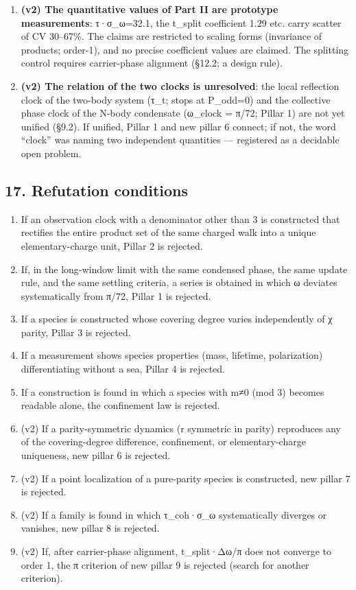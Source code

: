 \documentclass[
]{article}
\providecommand{\tightlist}{%
  \setlength{\itemsep}{0pt}\setlength{\parskip}{0pt}}
\begin{document}
\begin{enumerate}
  in-class series.
\item
  \textbf{(v2) The quantitative values of Part II are prototype
  measurements}: τ·σ\_ω=32.1, the t\_split coefficient 1.29 etc. carry
  scatter of CV 30--67\%. The claims are restricted to scaling forms
  (invariance of products; order-1), and no precise coefficient values
  are claimed. The splitting control requires carrier-phase alignment
  (§12.2; a design rule).
\item
  \textbf{(v2) The relation of the two clocks is unresolved}: the local
  reflection clock of the two-body system (τ\_t; stops at P\_odd=0) and
  the collective phase clock of the N-body condensate (ω\_clock = π/72;
  Pillar 1) are not yet unified (§9.2). If unified, Pillar 1 and new
  pillar 6 connect; if not, the word ``clock'' was naming two
  independent quantities --- registered as a decidable open problem.
\end{enumerate}

\subsection{17. Refutation conditions}\label{refutation-conditions}

\begin{enumerate}
\def\labelenumi{\arabic{enumi}.}
\tightlist
\item
  If an observation clock with a denominator other than 3 is constructed
  that rectifies the entire product set of the same charged walk into a
  unique elementary-charge unit, Pillar 2 is rejected.
\item
  If, in the long-window limit with the same condensed phase, the same
  update rule, and the same settling criteria, a series is obtained in
  which ω deviates systematically from π/72, Pillar 1 is rejected.
\item
  If a species is constructed whose covering degree varies independently
  of χ parity, Pillar 3 is rejected.
\item
  If a measurement shows species properties (mass, lifetime,
  polarization) differentiating without a sea, Pillar 4 is rejected.
\item
  If a construction is found in which a species with m≠0 (mod 3) becomes
  readable alone, the confinement law is rejected.
\item
  (v2) If a parity-symmetric dynamics (r symmetric in parity) reproduces
  any of the covering-degree difference, confinement, or
  elementary-charge uniqueness, new pillar 6 is rejected.
\item
  (v2) If a point localization of a pure-parity species is constructed,
  new pillar 7 is rejected.
\item
  (v2) If a family is found in which τ\_coh·σ\_ω systematically diverges
  or vanishes, new pillar 8 is rejected.
\item
  (v2) If, after carrier-phase alignment, t\_split·Δω/π does not
  converge to order 1, the π criterion of new pillar 9 is rejected
  (search for another criterion).
\end{enumerate}
\end{document}
